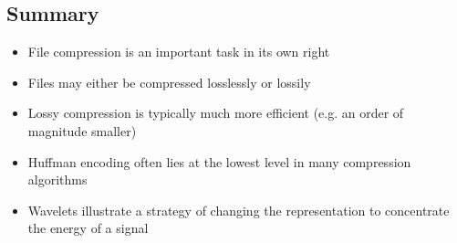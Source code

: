 
\begin{slide}
\section{Summary}

\begin{PauseHighLight}
  \begin{itemize}
  \item File compression is an important task in its own right\pause
  \item Files may either be compressed losslessly or lossily\pause
  \item Lossy compression is typically much more efficient (e.g. an
    order of magnitude smaller)\pause
  \item Huffman encoding often lies at the lowest level in many
    compression algorithms\pause
  \item Wavelets illustrate a strategy of changing the representation to
    concentrate the energy of a signal\pause
  \end{itemize}
\end{PauseHighLight}

\end{slide}

